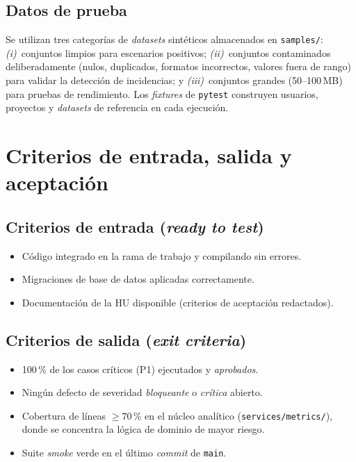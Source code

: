 \subsection*{Datos de prueba}
Se utilizan tres categorías de \emph{datasets} sintéticos almacenados en
\texttt{samples/}: \emph{(i)}~conjuntos limpios para escenarios positivos;
\emph{(ii)}~conjuntos contaminados deliberadamente (nulos, duplicados,
formatos incorrectos, valores fuera de rango) para validar la detección
de incidencias; y \emph{(iii)}~conjuntos grandes (50--100\,\acs{MB}) para
pruebas de rendimiento.  Los \emph{fixtures} de \texttt{pytest} construyen
usuarios, proyectos y \emph{datasets} de referencia en cada ejecución.


\section{Criterios de entrada, salida y aceptación}
\label{sec:anx-pruebas-criterios}

\subsection*{Criterios de entrada (\emph{ready to test})}
\begin{itemize}
  \item Código integrado en la rama de trabajo y compilando sin errores.
  \item Migraciones de base de datos aplicadas correctamente.
  \item Documentación de la \acs{HU} disponible (criterios de aceptación
        redactados).
\end{itemize}

\subsection*{Criterios de salida (\emph{exit criteria})}
\begin{itemize}
  \item 100\,\% de los casos críticos (P1) ejecutados y \emph{aprobados}.
  \item Ningún defecto de severidad \emph{bloqueante} o \emph{crítica}
        abierto.
  \item Cobertura de líneas $\geq 70$\,\% en el núcleo analítico
        (\texttt{services/metrics/}), donde se concentra la lógica de
        dominio de mayor riesgo.
  \item Suite \emph{smoke} verde en el último \emph{commit} de \texttt{main}.
\end{itemize}

